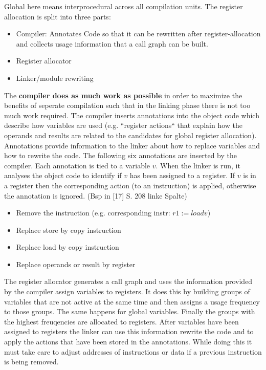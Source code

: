 \documentclass[a4paper,10pt]{article}
\begin{document}
Global here means interprocedural across all compilation units. The register allocation is split into three parts:
\begin{itemize}
 \item Compiler: Annotates Code so that it can be rewritten after register-allocation and collects usage information that a call graph can be built.
 \item Register allocator
 \item Linker/module rewriting
\end{itemize}

The  \textbf{compiler does as much work as possible} in order to maximize the benefits of seperate compilation such that in the linking phase there is not too much work required. The compiler inserts annotations into the object code which describe how variables are used (e.g. ``register actions`` that explain how the operands and results are related to the candidates for global register allocation). Annotations provide information to the linker about how to replace variables and how to rewrite the code. The following six annotations are inserted by the compiler. Each annotation is tied to a variable $v$. When the linker is run, it analyses the object code to identify if $v$ has been assigned to a register. If $v$ is in a register then the corresponding action (to an instruction) is applied, otherwise the annotation is ignored. (Bsp in [17] S. 208 linke Spalte)

\begin{itemize}
 \item {} Remove the instruction (e.g. corresponding instr: $r1 := load v$)
 \item {}  Replace store by copy instruction
 \item {}   Replace load by copy instruction
 \item {} Replace operands or result by register
\end{itemize}

The register allocator generates a call graph and uses the information provided by the compiler assign variables to registers. It does this by building groups of variables that are not active at the same time and then assigns a usage frequency to those groups. The same happens for global variables. Finally the groups with the highest freuqencies are allocated to registers. After variables have been assigned to registers the linker can use this information rewrite the code and to apply the actions that have been stored in the annotations. While doing this it must take care to adjust addresses of instructions or data if a previous instruction is being removed.
\end{document}
